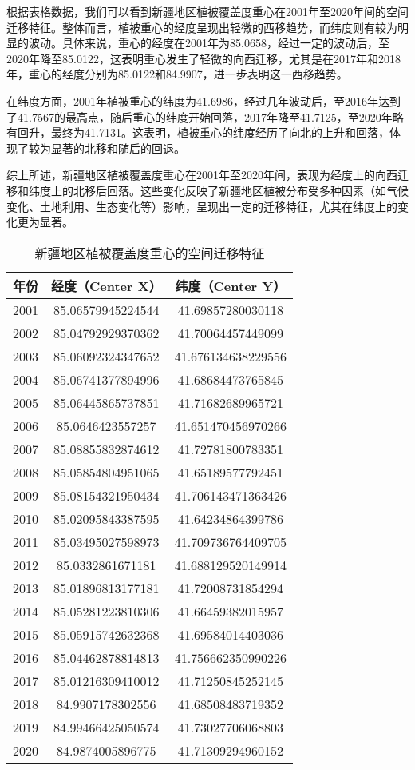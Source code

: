 \documentclass{article}
\begin{document}
	\par
		根据表格数据，我们可以看到新疆地区植被覆盖度重心在2001年至2020年间的空间迁移特征。整体而言，植被重心的经度呈现出轻微的西移趋势，而纬度则有较为明显的波动。具体来说，重心的经度在2001年为85.0658，经过一定的波动后，至2020年降至85.0122，这表明重心发生了轻微的向西迁移，尤其是在2017年和2018年，重心的经度分别为85.0122和84.9907，进一步表明这一西移趋势。
		
		在纬度方面，2001年植被重心的纬度为41.6986，经过几年波动后，至2016年达到了41.7567的最高点，随后重心的纬度开始回落，2017年降至41.7125，至2020年略有回升，最终为41.7131。这表明，植被重心的纬度经历了向北的上升和回落，体现了较为显著的北移和随后的回退。
		
		综上所述，新疆地区植被覆盖度重心在2001年至2020年间，表现为经度上的向西迁移和纬度上的北移后回落。这些变化反映了新疆地区植被分布受多种因素（如气候变化、土地利用、生态变化等）影响，呈现出一定的迁移特征，尤其在纬度上的变化更为显著。

	\begin{table}[H]
	\centering
	\begin{tabular}{|c|c|c|}
		\hline
		\textbf{年份} & \textbf{经度（Center X）} & \textbf{纬度（Center Y）} \\
		\hline
		2001 & 85.06579945224544 & 41.69857280030118 \\
		2002 & 85.04792929370362 & 41.70064457449099 \\
		2003 & 85.06092324347652 & 41.676134638229556 \\
		2004 & 85.06741377894996 & 41.68684473765845 \\
		2005 & 85.06445865737851 & 41.71682689965721 \\
		2006 & 85.0646423557257  & 41.651470456970266 \\
		2007 & 85.08855832874612 & 41.72781800783351 \\
		2008 & 85.05854804951065 & 41.65189577792451 \\
		2009 & 85.08154321950434 & 41.706143471363426 \\
		2010 & 85.02095843387595 & 41.64234864399786 \\
		2011 & 85.03495027598973 & 41.709736764409705 \\
		2012 & 85.0332861671181  & 41.688129520149914 \\
		2013 & 85.01896813177181 & 41.72008731854294 \\
		2014 & 85.05281223810306 & 41.66459382015957 \\
		2015 & 85.05915742632368 & 41.69584014403036 \\
		2016 & 85.04462878814813 & 41.756662350990226 \\
		2017 & 85.01216309410012 & 41.71250845252145 \\
		2018 & 84.9907178302556  & 41.68508483719352 \\
		2019 & 84.99466425050574 & 41.73027706068803 \\
		2020 & 84.9874005896775  & 41.71309294960152 \\
		\hline
			\end{tabular}
	\caption{新疆地区植被覆盖度重心的空间迁移特征}

		\end{table}
		
\end{document}
